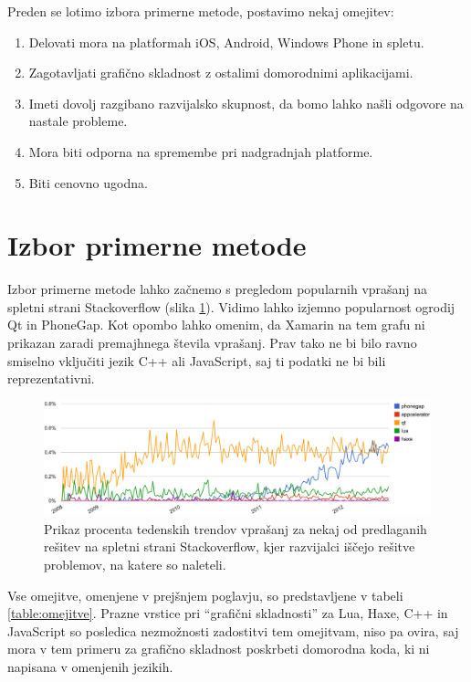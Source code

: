 Preden se lotimo izbora primerne metode, postavimo nekaj omejitev:

\begin{enumerate}
  \item Delovati mora na platformah iOS, Android, Windows Phone in spletu.
  \item Zagotavljati grafično skladnost z ostalimi domorodnimi aplikacijami.
  \item Imeti dovolj razgibano razvijalsko skupnost, da bomo lahko našli odgovore na nastale probleme.
  \item Mora biti odporna na spremembe pri nadgradnjah platforme.
  \item Biti cenovno ugodna.
\end{enumerate}

\section{Izbor primerne metode}

Izbor primerne metode lahko začnemo s pregledom popularnih vprašanj na spletni strani Stackoverflow (slika \ref{fig:stackoverflow-trends}). Vidimo lahko izjemno popularnost ogrodij Qt in PhoneGap. Kot opombo lahko omenim, da Xamarin na tem grafu ni prikazan zaradi premajhnega števila vprašanj. Prav tako ne bi bilo ravno smiselno vključiti jezik C++ ali JavaScript, saj ti podatki ne bi bili reprezentativni.

\begin{figure}
 \includegraphics[width=\linewidth]{stackoverflow-trends}
 \caption{Prikaz procenta tedenskih trendov vprašanj za nekaj od predlaganih rešitev na spletni strani Stackoverflow, kjer razvijalci iščejo rešitve problemov, na katere so naleteli.}
 \label{fig:stackoverflow-trends}
\end{figure}

Vse omejitve, omenjene v prejšnjem poglavju, so predstavljene v tabeli \ref{table:omejitve}. Prazne vrstice pri ``grafični skladnosti'' za Lua, Haxe, C++ in JavaScript so posledica nezmožnosti zadostitvi tem omejitvam, niso pa ovira, saj mora v tem primeru za grafično skladnost poskrbeti domorodna koda, ki ni napisana v omenjenih jezikih.

